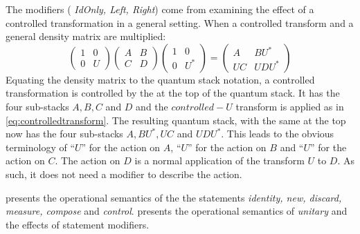 The  modifiers ( \emph{IdOnly, Left, Right}) come from examining the effect of
a controlled transformation in a general setting. When 
a controlled transform and a general density matrix are multiplied:
\begin{equation}
\begin{pmatrix}1&0\\0&U\end{pmatrix} 
\begin{pmatrix}A&B\\C&D\end{pmatrix} 
\begin{pmatrix}1&0\\0&U^{*}\end{pmatrix} =
\begin{pmatrix}A&B U^{*}\\U C&U D U^{*}\end{pmatrix}\label{eq:controlledtransform}
\end{equation} 
Equating the density matrix to the quantum stack notation, a controlled
transformation is 
controlled by the \qbit{} at the top of the quantum stack. It has
the four sub-stacks $A,B,C$ and $D$ and the $controlled-U$ 
transform is applied as in \ref{eq:controlledtransform}.
The resulting quantum stack, with the same \qbit{} at the 
top now has the four sub-stacks $A,B U^{*},U C$ and $U D U^{*}$. This 
leads to the obvious terminology of ``\IdOnly $U$'' for the action on 
$A$, ``\Right $U$'' for the action on
$B$ and ``\Left $U$'' for the action on $C$.  The action on $D$ is
a normal application of the transform $U$ to $D$. As such, it does
not need a modifier to describe the action.

 presents the operational semantics
of the the \lqpl{} statements \emph{identity, new, discard, measure, compose}  and 
\emph{control}.
 presents the operational semantics 
of \emph{unitary} and the effects of statement modifiers.

